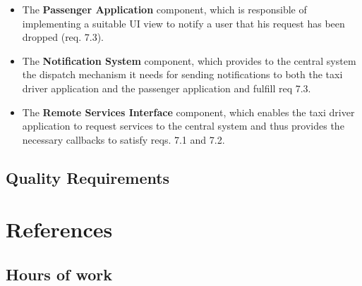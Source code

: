 \begin{itemize}
\begin{itemize}
	\item The \textbf{Passenger Application} component, which is responsible of implementing a suitable UI view to notify a user that his request has been dropped (req. 7.3).
	\item The \textbf{Notification System} component, which provides to the central system the dispatch mechanism it needs for sending notifications to both the taxi driver application and the passenger application and fulfill req 7.3.
	\item The \textbf{Remote Services Interface} component, which enables the taxi driver application to request services to the central system and thus provides the necessary callbacks to satisfy reqs. 7.1 and 7.2.
	\end{itemize}
	\end{itemize}

\section{Quality Requirements}

\chapter{References}

\begin{appendices}

\chapter{Hours of work}

\end{appendices}